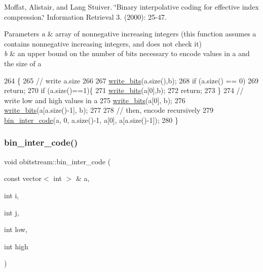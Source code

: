 Moffat, Alistair, and Lang Stuiver. \char`\"{}\+Binary interpolative coding for effective index compression.\char`\"{} Information Retrieval 3. (2000)\+: 25-\/47.


\begin{DoxyParams}{Parameters}
{\em a} & array of nonnegative increasing integers (this function assumes a contains nonnegative increasing integers, and does not check it) \\
\hline
{\em b} & an upper bound on the number of bits necessary to encode values in a and the size of a \\
\hline
\end{DoxyParams}

\begin{DoxyCode}
264                                                           \{
265   \textcolor{comment}{// write a.size}
266 
267   \hyperlink{classobitstream_afb0cc2fb4f739881436d887bd4770355}{write\_bits}(a.size(),b);
268   \textcolor{keywordflow}{if} (a.size() == 0)
269     \textcolor{keywordflow}{return};
270   \textcolor{keywordflow}{if} (a.size()==1)\{
271     \hyperlink{classobitstream_afb0cc2fb4f739881436d887bd4770355}{write\_bits}(a[0],b);
272     \textcolor{keywordflow}{return};
273   \}
274   \textcolor{comment}{// write low and high values in a}
275   \hyperlink{classobitstream_afb0cc2fb4f739881436d887bd4770355}{write\_bits}(a[0], b);
276   \hyperlink{classobitstream_afb0cc2fb4f739881436d887bd4770355}{write\_bits}(a[a.size()-1], b);
277 
278   \textcolor{comment}{// then, encode recursively}
279   \hyperlink{classobitstream_a945c237be04936240953ba927486cde1}{bin\_inter\_code}(a, 0, a.size()-1, a[0], a[a.size()-1]);
280 \}
\end{DoxyCode}
\mbox{\label{classobitstream_aae355189c570d0fb7c3aa01ee3e71d8a}} 
\subsubsection{\texorpdfstring{bin\+\_\+inter\+\_\+code()}{bin\_inter\_code()}\hspace{0.1cm}{\footnotesize\ttfamily [2/2]}}
{\footnotesize\ttfamily void obitstream\+::bin\+\_\+inter\+\_\+code (\begin{DoxyParamCaption}\item[{const vector$<$ int $>$ \&}]{a,  }\item[{int}]{i,  }\item[{int}]{j,  }\item[{int}]{low,  }\item[{int}]{high }\end{DoxyParamCaption})}



